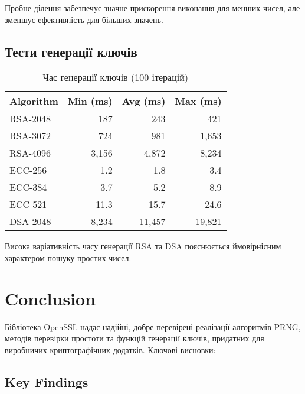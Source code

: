 Пробне ділення забезпечує значне прискорення виконання для менших чисел, але зменшує ефективність для більших 
значень.

\subsection{Тести генерації ключів}

\begin{table}[ht]
    \centering
    \begin{tabular}{|l|r|r|r|}
        \hline
        \textbf{Algorithm} & \textbf{Min (ms)} & \textbf{Avg (ms)} & \textbf{Max (ms)} \\
        \hline
        RSA-2048           & 187               & 243               & 421               \\
        RSA-3072           & 724               & 981               & 1,653             \\
        RSA-4096           & 3,156             & 4,872             & 8,234             \\
        \hline
        ECC-256            & 1.2               & 1.8               & 3.4               \\
        ECC-384            & 3.7               & 5.2               & 8.9               \\
        ECC-521            & 11.3              & 15.7              & 24.6              \\
        \hline
        DSA-2048           & 8,234             & 11,457            & 19,821            \\
        \hline
    \end{tabular}
    \caption{Час генерації ключів (100 ітерацій)}
\end{table}

Висока варіативність часу генерації RSA та DSA пояснюється ймовірнісним характером пошуку простих чисел.

\section{Conclusion}

Бібліотека OpenSSL надає надійні, добре перевірені реалізації алгоритмів PRNG, методів перевірки простоти та 
функцій генерації ключів, придатних для виробничих криптографічних додатків. Ключові висновки:
\subsection{Key Findings}

